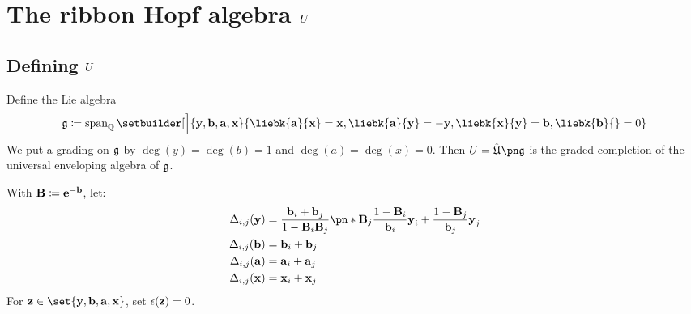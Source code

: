 \documentclass{beamer}
\theoremstyle{theorem}
\begin{document}
\section{The ribbon Hopf algebra $U$}

\subsection{Defining $U$}

\begin{frame}
        \begin{definition}
        Define the Lie algebra
        \begin{equation*}
        \fg \defeq \Span_{\Q}\setbuilder[\Big]{\yo, \bo, \ao, \xo}{
                \liebk{\ao}{\xo} = \xo,
                \liebk{\ao}{\yo} = -\yo,
                \liebk{\xo}{\yo} = \bo,
                \liebk{\bo}{ } = 0
        }
        \end{equation*}
        We put a grading on $\mathfrak{g}$ by $\deg(y) = \deg(b) = 1$ and
        $\deg(a) = \deg(x) = 0$. Then $\CU=\uea*{\fg}$ is the graded completion
        of the universal enveloping algebra of $\mathfrak{g}$.
        \end{definition}
\end{frame}

\begin{frame}
        \begin{definition}
                With $\boldsymbol{\mathbf{B}} \coloneq \boldsymbol{\mathbf{e}}^{-\boldsymbol{\mathbf{b}}}$, let:
                \begin{equation}\begin{aligned}
                        \comult_{i,j}(\yo) &=
                        \frac{\bo_i+\bo_j}{1-\Bo_i\Bo_j} \pn*{
                                \Bo_j\frac{1-\Bo_i}{\bo_i}\yo_i+
                                \frac{1-\Bo_j}{\bo_j}\yo_j
                        }\\
                        \comult_{i,j}(\bo) &= \bo_i + \bo_j\\
                        \comult_{i,j}(\ao) &= \ao_i + \ao_j\\
                        \comult_{i,j}(\xo) &= \xo_i + \xo_j\\
                \end{aligned}\end{equation}
                For $\zo\in\set{\yo, \bo, \ao, \xo}$, set $\epsilon(\boldsymbol{\mathbf{z}})=0$.
        \end{definition}
\end{frame}
\end{document}

